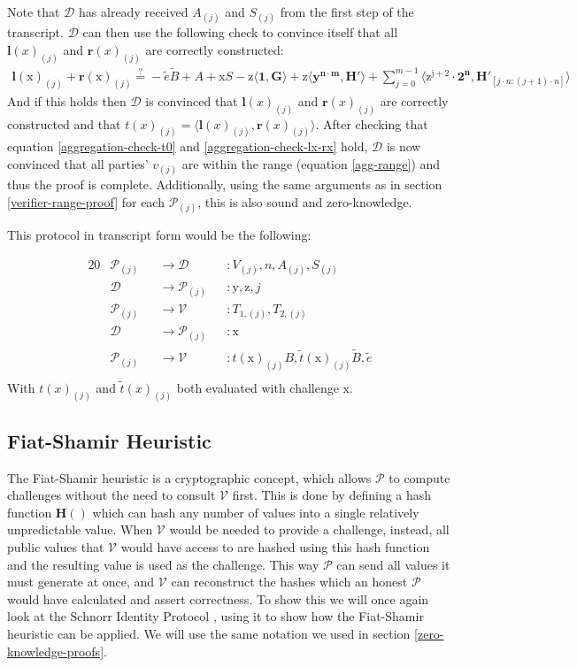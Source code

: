 \documentclass{article}
\newcommand{\eq}[1]{\begin{alignat*}{20}#1\end{alignat*}}
\newcommand{\eqn}[2]{\begin{equation}\label{#1}\begin{split}#2\end{split}\end{equation}}
\renewcommand{\vec}[1]{\boldsymbol{#1}}
\newcommand{\ran}[1]{\mathrm{#1}}
\newcommand{\vecran}[1]{\mathbf{#1}}
\newcommand{\V}{\mathcal{V}}
\renewcommand{\P}{\mathcal{P}}
\newcommand{\D}{\mathcal{D}}
\newcommand{\dotp}[2]{\langle #1, #2 \rangle}
\newcommand{\blind}[1]{\widetilde{#1}}
\newcommand{\bt}{\blind{t}}
\newcommand{\bB}{\blind{B}}
\newcommand{\be}{\blind{e}}
\begin{document}
Note that $\D$ has already received $A_{(j)}$ and $S_{(j)}$ from the
first step of the transcript. $\D$ can then use the following check
to convince itself that all $\vec{l}(x)_{(j)}$ and $\vec{r}(x)_{(j)}$
are correctly constructed:
\eqn{aggregation-check-lx-rx}{
	\vec{l}(\ran{x})_{(j)} + \vec{r}(\ran{x})_{(j)} \stackrel{?}{=}
	-\be\bB + A + \ran{x}S - \ran{z}\dotp{\vec{1}}{\vec{G}} +
	\ran{z}\dotp{\vecran{y}^{\vec{n \cdot m}}}{\vec{H'}} +
	\sum^{m-1}_{j = 0}\dotp{\ran{z^{j+2}} \cdot \vec{2^n}}{\vec{H'}_{[j \cdot n: (j+1) \cdot n]}}
}
And if this holds then $\D$ is convinced that $\vec{l}(x)_{(j)}$ and
$\vec{r}(x)_{(j)}$ are correctly constructed and that $t(x)_{(j)} =
\dotp{\vec{l}(x)_{(j)}}{\vec{r}(x)_{(j)}}$. After checking that equation
\ref{aggregation-check-t0} and \ref{aggregation-check-lx-rx} hold, $\D$
is now convinced that all parties' $v_{(j)}$ are within the range
(equation \ref{agg-range}) and thus the proof is complete. Additionally, using
the same arguments as in section \ref{verifier-range-proof} for each
$\P_{(j)}$, this is also sound and zero-knowledge.

This protocol in transcript form would be the following: 

\eq{
	&\P_{(j)} &&\rightarrow \D &&: V_{(j)}, n, A_{(j)}, S_{(j)} \\
	&\D &&\rightarrow \P_{(j)} &&: \ran{y}, \ran{z}, j \\
	&\P_{(j)} &&\rightarrow \V &&: T_{1, (j)}, T_{2,(j)} \\
	&\D &&\rightarrow \P_{(j)} &&: \ran{x} \\
	&\P_{(j)} &&\rightarrow \V &&: t(\ran{x})_{(j)} B, \bt(\ran{x})_{(j)}\bB, \be \\
}
With $t(x)_{(j)}$ and $\bt(x)_{(j)}$ both evaluated with challenge $\ran{x}$.

\newpage

\subsection{Fiat-Shamir Heuristic}\label{fiat-shamir-heuristic}

The Fiat-Shamir heuristic \cite{zkdocs-fiat-shamir} is a cryptographic
concept, which allows $\P$ to compute challenges without the need to
consult $\V$ first. This is done by defining a hash function
$\textbf{H}()$ which can hash any number of values into a single
relatively unpredictable value. When $\V$ would be needed
to provide a challenge, instead, all public values that $\V$ would
have access to are hashed using this hash function and the resulting
value is used as the challenge. This way $\P$ can send all values
it must generate at once, and $\V$ can reconstruct the hashes
which an honest $\P$ would have calculated and assert correctness. To
show this we will once again look at the Schnorr Identity Protocol
\cite{zkdocs-schnorr}, using it to show how the Fiat-Shamir heuristic
can be applied. We will use the same notation we used in section
\ref{zero-knowledge-proofs}.
\end{document}
